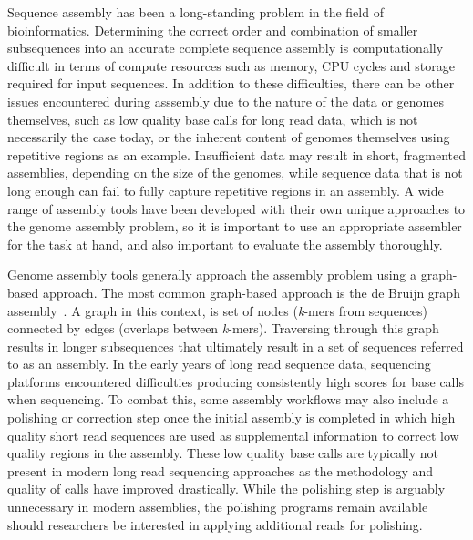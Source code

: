Sequence assembly has been a long-standing problem in the field of
bioinformatics\cite{Nagarajan2013}. Determining the correct order and
combination of smaller subsequences into an accurate complete sequence
assembly is computationally difficult in terms of compute resources
such as memory, CPU cycles and storage required for input
sequences\cite{Nagarajan2013}. In addition to these difficulties,
there can be other issues encountered during asssembly due to the
nature of the data or genomes themselves, such as low quality base
calls for long read data, which is not necessarily the case today, or
the inherent content of genomes themselves using repetitive regions as
an example. Insufficient data may result in short, fragmented
assemblies, depending on the size of the genomes, while sequence data
that is not long enough can fail to fully capture repetitive regions
in an assembly. A wide range of assembly tools have been developed
with their own unique approaches to the genome assembly problem, so it
is important to use an appropriate assembler for the task at hand, and
also important to evaluate the assembly thoroughly.

Genome assembly tools generally approach the assembly problem using a
graph-based approach. The most common graph-based approach is the de
Bruijn graph assembly~\cite{Compeau2011}. A graph in this context, is
set of nodes (\textit{k}-mers from sequences) connected by edges
(overlaps between \textit{k}-mers). Traversing through this graph
results in longer subsequences that ultimately result in a set of
sequences referred to as an assembly. In the early years of long read
sequence data, sequencing platforms encountered difficulties producing
consistently high scores for base calls when sequencing. To combat
this, some assembly workflows may also include a polishing or
correction step once the initial assembly is completed in which high
quality short read sequences are used as supplemental information to
correct low quality regions in the assembly. These low quality base
calls are typically not present in modern long read sequencing
approaches as the methodology and quality of calls have improved
drastically. While the polishing step is arguably unnecessary in
modern assemblies, the polishing programs remain available should
researchers be interested in applying additional reads for polishing.

